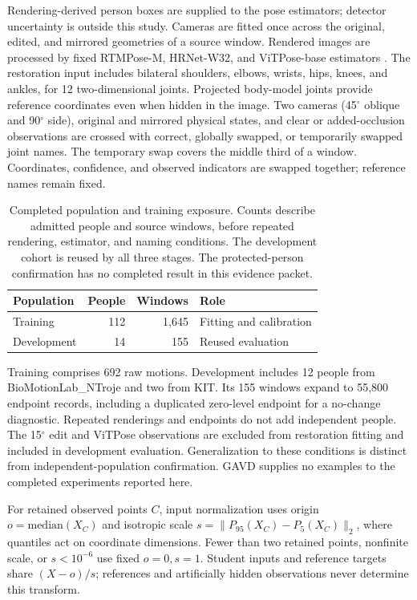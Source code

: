 \documentclass{article}
\newcommand{\degunit}{^{\circ}}
\begin{document}
Rendering-derived person boxes are supplied to the pose estimators; detector uncertainty is outside this study. Cameras are fitted once across the original, edited, and mirrored geometries of a source window. Rendered images are processed by fixed RTMPose-M, HRNet-W32, and ViTPose-base estimators \citep{jiang2023rtmpose,sun2019hrnet,xu2022vitpose}. The restoration input includes bilateral shoulders, elbows, wrists, hips, knees, and ankles, for 12 two-dimensional joints. Projected body-model joints provide reference coordinates even when hidden in the image. Two cameras (45$\degunit$ oblique and 90$\degunit$ side), original and mirrored physical states, and clear or added-occlusion observations are crossed with correct, globally swapped, or temporarily swapped joint names. The temporary swap covers the middle third of a window. Coordinates, confidence, and observed indicators are swapped together; reference names remain fixed.

\begin{table}[h]\centering
\caption{Completed population and training exposure. Counts describe admitted people and source windows, before repeated rendering, estimator, and naming conditions. The development cohort is reused by all three stages. The protected-person confirmation has no completed result in this evidence packet.}
\label{tab:data}
\begin{tabular}{lrrl}\toprule
Population & People & Windows & Role \\\midrule
Training &112&1,645& Fitting and calibration\\
Development &14&155& Reused evaluation\\\bottomrule
\end{tabular}
\end{table}

Training comprises 692 raw motions. Development includes 12 people from BioMotionLab\_NTroje and two from KIT. Its 155 windows expand to 55,800 endpoint records, including a duplicated zero-level endpoint for a no-change diagnostic. Repeated renderings and endpoints do not add independent people. The 15$\degunit$ edit and ViTPose observations are excluded from restoration fitting and included in development evaluation. Generalization to these conditions is distinct from independent-population confirmation. GAVD supplies no examples to the completed experiments reported here.

For retained observed points $C$, input normalization uses origin $o=\mathrm{median}(X_C)$ and isotropic scale $s=\|P_{95}(X_C)-P_5(X_C)\|_2$, where quantiles act on coordinate dimensions. Fewer than two retained points, nonfinite scale, or $s<10^{-6}$ use fixed $o=0,s=1$. Student inputs and reference targets share $(X-o)/s$; references and artificially hidden observations never determine this transform.
\end{document}
